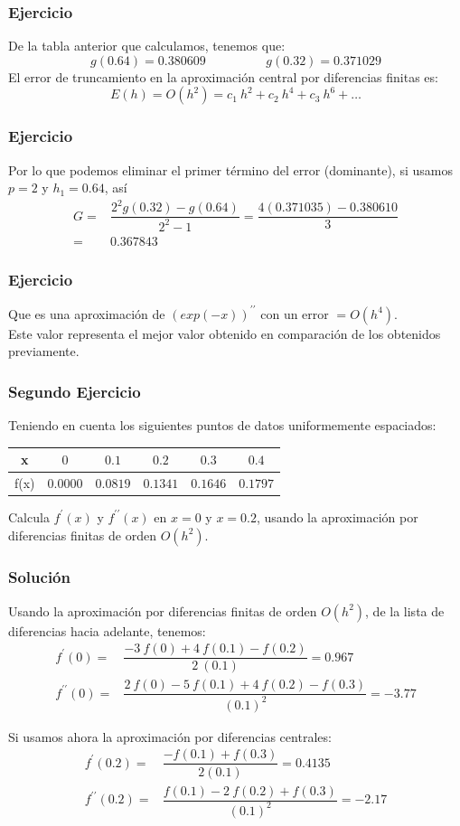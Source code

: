 \begin{frame}
\frametitle{Ejercicio}
De la tabla anterior que calculamos, tenemos que:
\[ g(0.64) = 0.380609 \hspace{2cm} g(0.32) = 0.371029\]
El error de truncamiento en la aproximación central por diferencias finitas es:
\[E(h) = O(h^{2}) = c_{1} \: h^{2} + c_{2} \: h^{4} + c_{3} \: h^{6} + \ldots\]
\end{frame}
\begin{frame}
\frametitle{Ejercicio}
Por lo que podemos eliminar el primer término del error (dominante), si usamos $p = 2$ y $h_{1} = 0.64$, así
\[ \begin{split}
G =& \dfrac{2^{2}g(0.32)- g(0.64)}{2^{2}-1} = \dfrac{4(0.371035)-0.380610}{3} \\
 =& 0.367843
\end{split} \]
\end{frame}
\begin{frame}
\frametitle{Ejercicio}
Que es una aproximación de $(exp(-x))^{\prime \prime}$ con un error $=O(h^{4})$.
\\
\bigskip
Este valor representa el mejor valor obtenido en comparación de los obtenidos previamente.
\end{frame}
\begin{frame}
\frametitle{Segundo Ejercicio}
Teniendo en cuenta los siguientes puntos de datos uniformemente espaciados:
\begin{center}
\begin{tabular}{c | c | c | c | c | c }
x & $0$ & $0.1$ & $0.2$ & $0.3$ & $0.4$ \\ \hline
f(x) & $0.0000$ & $0.0819$ & $0.1341$ & $0.1646$ & $0.1797$
\end{tabular}
\end{center}
Calcula $f^{\prime}(x)$ y $f^{\prime\prime}(x)$ en $x = 0$ y $x = 0.2$, usando la aproximación por diferencias finitas de orden $O(h^{2})$.
\end{frame}
\begin{frame}
\frametitle{Solución}
Usando la aproximación por diferencias finitas de orden $O(h^{2})$, de la lista de diferencias hacia adelante, tenemos:
\[ \begin{split} 
f^{\prime}(0) =& \dfrac{-3 \: f(0) + 4 \: f(0.1) - f(0.2)}{2 \: (0.1)} = 0.967 \\
f^{\prime \prime}(0) =& \dfrac{2 \: f(0) - 5 \: f(0.1) + 4 \: f(0.2) - f(0.3)}{(0.1)^{2}} = -3.77
\end{split} \]
\end{frame}
\begin{frame}
Si usamos ahora la aproximación por diferencias centrales:
\[ \begin{split}
f^{\prime}(0.2) =& \dfrac{-f(0.1) + f(0.3)}{2(0.1)} = 0.4135 \\
f^{\prime \prime}(0.2) =& \dfrac{f(0.1) - 2 \: f(0.2) + f(0.3)}{(0.1)^{2}} = -2.17
\end{split} \]
\end{frame}
